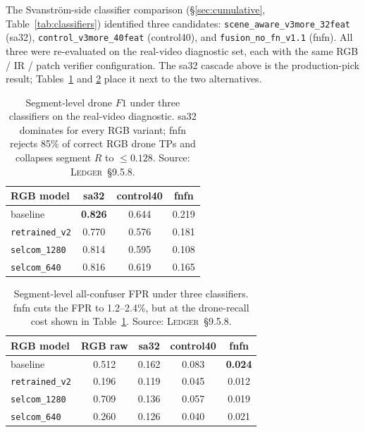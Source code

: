 \documentclass[12pt,a4paper,oneside,openright]{book}
\begin{document}
The Svanstr\"om-side classifier comparison (\S\ref{sec:cumulative}, Table~\ref{tab:classifiers}) identified three candidates: \texttt{scene\_aware\_v3more\_32feat} (sa32), \texttt{control\_v3more\_40feat} (control40), and \texttt{fusion\_no\_fn\_v1.1} (fnfn). All three were re-evaluated on the real-video diagnostic set, each with the same RGB / IR / patch verifier configuration. The sa32 cascade above is the production-pick result; Tables~\ref{tab:cascade_classifier_drone} and \ref{tab:cascade_classifier_fpr} place it next to the two alternatives.

\begin{table}[htbp]
    \centering
    \caption{Segment-level drone $F1$ under three classifiers on the real-video diagnostic. sa32 dominates for every RGB variant; fnfn rejects 85\% of correct RGB drone TPs and collapses segment $R$ to $\leq 0.128$. Source: \textsc{Ledger}~\S9.5.8.}
    \label{tab:cascade_classifier_drone}
    \begin{tabular}{lccc}
        \toprule
        RGB model & sa32 & control40 & fnfn \\
        \midrule
        baseline           & \textbf{0.826} & 0.644 & 0.219 \\
        \texttt{retrained\_v2} & 0.770 & 0.576 & 0.181 \\
        \texttt{selcom\_1280}  & 0.814 & 0.595 & 0.108 \\
        \texttt{selcom\_640}   & 0.816 & 0.619 & 0.165 \\
        \bottomrule
    \end{tabular}
\end{table}

\begin{table}[htbp]
    \centering
    \caption{Segment-level all-confuser FPR under three classifiers. fnfn cuts the FPR to 1.2--2.4\%, but at the drone-recall cost shown in Table~\ref{tab:cascade_classifier_drone}. Source: \textsc{Ledger}~\S9.5.8.}
    \label{tab:cascade_classifier_fpr}
    \begin{tabular}{lcccc}
        \toprule
        RGB model & RGB raw & sa32 & control40 & fnfn \\
        \midrule
        baseline           & 0.512 & 0.162 & 0.083 & \textbf{0.024} \\
        \texttt{retrained\_v2} & 0.196 & 0.119 & 0.045 & 0.012 \\
        \texttt{selcom\_1280}  & 0.709 & 0.136 & 0.057 & 0.019 \\
        \texttt{selcom\_640}   & 0.260 & 0.126 & 0.040 & 0.021 \\
        \bottomrule
    \end{tabular}
\end{table}
\end{document}
